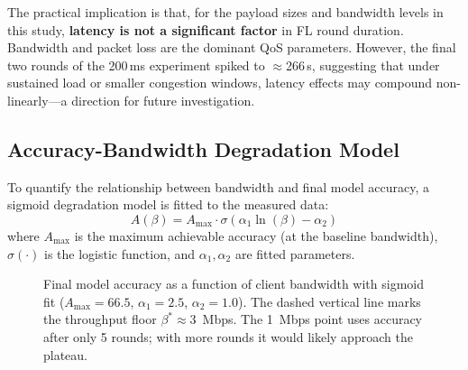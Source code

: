 \documentclass[12pt,a4paper]{report}
\begin{document}
The practical implication is that, for the payload sizes and bandwidth
levels in this study, \textbf{latency is not a significant factor} in FL
round duration.  Bandwidth and packet loss are the dominant QoS
parameters.  However, the final two rounds of the 200\,ms experiment
spiked to $\approx$266\,s, suggesting that under sustained load or
smaller congestion windows, latency effects may compound
non-linearly---a direction for future investigation.

\subsection{Accuracy-Bandwidth Degradation Model}

To quantify the relationship between bandwidth and final model accuracy,
a sigmoid degradation model is fitted to the measured data:
\begin{equation}
  A(\beta) = A_{\max} \cdot \sigma\!\left(\alpha_1 \ln(\beta) - \alpha_2\right)
  \label{eq:sigmoid_model}
\end{equation}
where $A_{\max}$ is the maximum achievable accuracy (at the baseline
bandwidth), $\sigma(\cdot)$ is the logistic function, and
$\alpha_1, \alpha_2$ are fitted parameters.

\begin{figure}[H]
\centering
{}
\caption{Final model accuracy as a function of client bandwidth with
  sigmoid fit ($A_{\max}=66.5$, $\alpha_1=2.5$, $\alpha_2=1.0$).  The
  dashed vertical line marks the throughput floor $\beta^* \approx 3$~Mbps.
  The 1~Mbps point uses accuracy after only 5 rounds; with more rounds it
  would likely approach the plateau.}
\label{fig:acc_vs_bw}
\end{figure}
\end{document}
